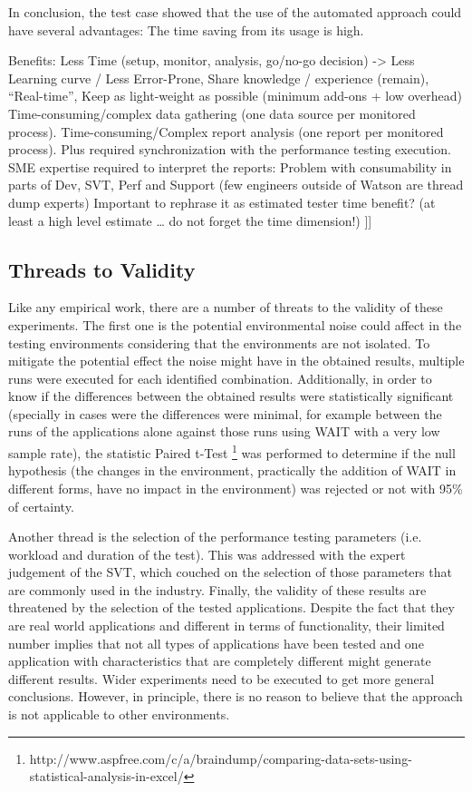 \documentclass[runningheads,a4paper]{llncs}
\begin{document}
In conclusion, the test case showed that the use of the automated approach
could have several advantages: The time saving from its usage is high.

Benefits: Less Time (setup, monitor, analysis, go/no-go decision) -> Less
Learning curve / Less Error-Prone, Share knowledge / experience (remain), “Real-time”, Keep as light-weight as possible (minimum add-ons + low overhead)
Time-consuming/complex data gathering (one data source per monitored process).
Time-consuming/Complex report analysis (one report per monitored process).
Plus required synchronization with the performance testing execution.
SME expertise required to interpret the reports: Problem with consumability in
parts of Dev, SVT, Perf and Support (few engineers outside of Watson are thread dump experts)
Important to rephrase it as estimated tester time benefit? (at least a high
level estimate … do not forget the time dimension!)
]]

\subsection{Threads to Validity}

Like any empirical work, there are a number of threats to the validity of these
experiments. The first one is the potential environmental noise could affect in
the testing environments considering that the environments are not isolated. To
mitigate the potential effect the noise might have in the obtained results, multiple runs 
were executed for each identified combination. Additionally, in order to know if
the differences between the obtained results were statistically significant (specially in cases 
were the differences were minimal, for example between the runs of the
applications alone against those runs using WAIT with a very low sample rate), the statistic Paired t-Test
\footnote{http://www.aspfree.com/c/a/braindump/comparing-data-sets-using-statistical-analysis-in-excel/}
was performed to determine if the null hypothesis (the changes in the
environment, practically the addition of WAIT in different forms, have no
impact in the environment) was rejected or not with 95\% of certainty.

Another thread is the selection of the performance testing parameters (i.e.
workload and duration of the test). This was addressed with the expert judgement 
of the SVT, which couched on the selection of those parameters that are
commonly used in the industry. Finally, the validity of these results are
threatened by the selection of the tested applications. Despite the fact that
they are real world applications and different in terms of functionality, their
limited number implies that not all types of applications have been tested and
one application with characteristics that are completely different might
generate different results. Wider experiments need to be executed to get more
general conclusions. However, in principle, there is no reason to believe that
the approach is not applicable to other environments.
\end{document}
